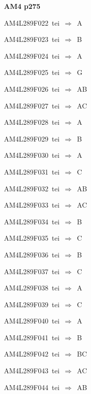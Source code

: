 \par\vfill\eject
{\bf\hfill AM4 p275\hfill\hbox{}}\par\bigskip
{\sixrm AM4L289F022\ {\sixit tei}\ }$\Rightarrow$\ {\tenit A}\par\smallskip
{\sixrm AM4L289F023\ {\sixit tei}\ }$\Rightarrow$\ B\par\smallskip
{\sixrm AM4L289F024\ {\sixit tei}\ }$\Rightarrow$\ {\tenit A}\par\smallskip
{\sixrm AM4L289F025\ {\sixit tei}\ }$\Rightarrow$\ G\par\smallskip
{\sixrm AM4L289F026\ {\sixit tei}\ }$\Rightarrow$\ AB\par\smallskip
{\sixrm AM4L289F027\ {\sixit tei}\ }$\Rightarrow$\ AC\par\smallskip
{\sixrm AM4L289F028\ {\sixit tei}\ }$\Rightarrow$\ A\par\smallskip
{\sixrm AM4L289F029\ {\sixit tei}\ }$\Rightarrow$\ B\par\smallskip
{\sixrm AM4L289F030\ {\sixit tei}\ }$\Rightarrow$\ A\par\smallskip
{\sixrm AM4L289F031\ {\sixit tei}\ }$\Rightarrow$\ C\par\smallskip
{\sixrm AM4L289F032\ {\sixit tei}\ }$\Rightarrow$\ AB\par\smallskip
{\sixrm AM4L289F033\ {\sixit tei}\ }$\Rightarrow$\ AC\par\smallskip
{\sixrm AM4L289F034\ {\sixit tei}\ }$\Rightarrow$\ B\par\smallskip
{\sixrm AM4L289F035\ {\sixit tei}\ }$\Rightarrow$\ C\par\smallskip
{\sixrm AM4L289F036\ {\sixit tei}\ }$\Rightarrow$\ B\par\smallskip
{\sixrm AM4L289F037\ {\sixit tei}\ }$\Rightarrow$\ C\par\smallskip
{\sixrm AM4L289F038\ {\sixit tei}\ }$\Rightarrow$\ A\par\smallskip
{\sixrm AM4L289F039\ {\sixit tei}\ }$\Rightarrow$\ C\par\smallskip
{\sixrm AM4L289F040\ {\sixit tei}\ }$\Rightarrow$\ A\par\smallskip
{\sixrm AM4L289F041\ {\sixit tei}\ }$\Rightarrow$\ B\par\smallskip
{\sixrm AM4L289F042\ {\sixit tei}\ }$\Rightarrow$\ BC\par\smallskip
{\sixrm AM4L289F043\ {\sixit tei}\ }$\Rightarrow$\ AC\par\smallskip
{\sixrm AM4L289F044\ {\sixit tei}\ }$\Rightarrow$\ AB\par\smallskip
